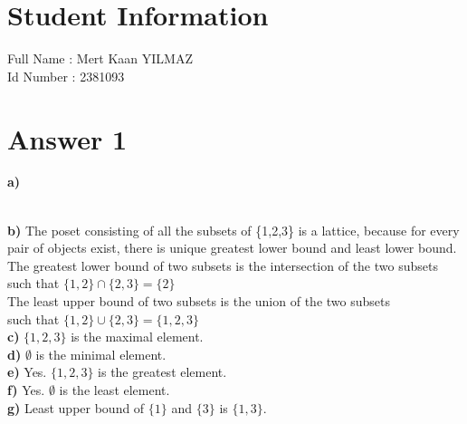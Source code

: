 \documentclass[12pt]{article}
\begin{document}
\section*{Student Information } 
Full Name :  Mert Kaan YILMAZ\\
Id Number :  2381093\\

\section*{Answer 1}
\textbf{a)} \\ 
     \\
\textbf{b)} The poset consisting of all the subsets of \{1,2,3\} is a lattice, because for every pair of objects exist, there is unique greatest lower bound and least lower bound. \\
The greatest lower bound of two subsets is the intersection of the two subsets \\such that $\{1,2\}\cap\{2,3\} = \{2\}$ \\
The least upper bound of two subsets is the union of the two subsets \\such that $\{1,2\}\cup\{2,3\} = \{1,2,3\}$ \\
\textbf{c)} $\{1,2,3\}$ is the maximal element. \\
\textbf{d)} $\emptyset$ is the minimal element. \\ 
\textbf{e)} Yes. $\{1,2,3\}$ is the greatest element. \\
\textbf{f)} Yes. $\emptyset$ is the least element. \\ 
\textbf{g)} Least upper bound of $\{1\}$ and $\{3\}$ is $\{1,3\}$.\\
\end{document}
